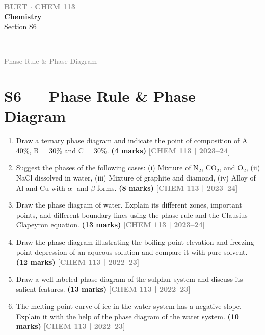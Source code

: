 \documentclass[12pt,a3paper]{article}
\newcommand{\yr}[1]{\hfill\textcolor{gray}{\small\textbf{[#1]}}}
\newcommand{\mk}[1]{\textcolor{orange!70!black}{\small\textbf{(#1 marks)}}}
\newcommand{\secdivider}[4]{%
  \newpage\thispagestyle{empty}%
  \vspace*{\fill}%
  \begin{tcolorbox}[enhanced,colback=#4!7,colframe=#3,boxrule=1.5pt,arc=8pt,
    left=20pt,right=20pt,top=22pt,bottom=22pt,
    shadow={3pt}{-3pt}{0pt}{black!15}]
    \centering
    {\large\textcolor{gray}{\textbf{BUET $\cdot$ CHEM 113}}}\\[8pt]
    {\fontsize{26}{32}\selectfont\bfseries\textcolor{#3}{Chemistry}}\\[6pt]
    {\fontsize{15}{19}\selectfont\textcolor{dgray}{#1}}\\[12pt]
    \textcolor{#3!60}{\rule{0.5\textwidth}{0.5pt}}\\[6pt]
    {\small\textcolor{gray}{#2}}
  \end{tcolorbox}%
  \vspace*{\fill}\newpage%
}
\begin{document}
\secdivider{Section S6}{Phase Rule \& Phase Diagram}{cF}{cF}
\label{sec:S6}
\section{S6 --- Phase Rule \& Phase Diagram}

\begin{enumerate}
\item Draw a ternary phase diagram and indicate the point of composition of A = 40\%, B = 30\% and C = 30\%. \mk{4}
\yr{CHEM 113 | 2023--24}



\item Suggest the phases of the following cases: (i) Mixture of N$_2$, CO$_2$, and O$_2$, (ii) NaCl dissolved in water, (iii) Mixture of graphite and diamond, (iv) Alloy of Al and Cu with $\alpha$- and $\beta$-forms. \mk{8}
\yr{CHEM 113 | 2023--24}




\item Draw the phase diagram of water. Explain its different zones, important points, and different boundary lines using the phase rule and the Clausius-Clapeyron equation. \mk{13}
\yr{CHEM 113 | 2023--24}




\item Draw the phase diagram illustrating the boiling point elevation and freezing point depression of an aqueous solution and compare it with pure solvent. \mk{12}
\yr{CHEM 113 | 2022--23}





\item Draw a well-labeled phase diagram of the sulphur system and discuss its salient features. \mk{13}
\yr{CHEM 113 | 2022--23}




\item The melting point curve of ice in the water system has a negative slope. Explain it with the help of the phase diagram of the water system. \mk{10}
\yr{CHEM 113 | 2022--23}





\end{enumerate}
\end{document}
